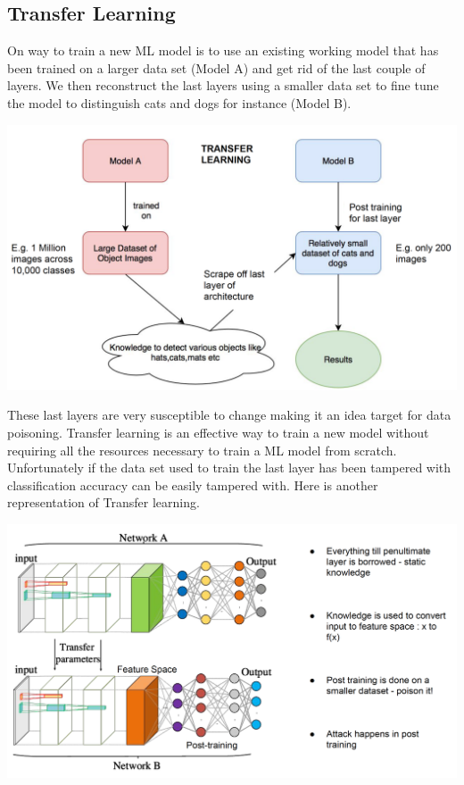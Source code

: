 \documentclass[twoside]{article}
\begin{document}
\subsection{Transfer Learning}

On way to train a new ML model is to use an existing working model that has been trained on a larger data set (Model A) and get rid of the last couple of layers. We then reconstruct the last layers using a smaller data set to fine tune the model to distinguish cats and dogs for instance (Model B). 

\begin{center}
    \includegraphics[scale=0.3]{MLTransfer.png}
\end{center}

These last layers are very susceptible to change making it an idea target for data poisoning. Transfer learning is an effective way to train a new model without requiring all the resources necessary to train a ML model from scratch. Unfortunately if the data set used to train the last layer has been tampered with classification accuracy can be easily tampered with. Here is another representation of Transfer learning.

\begin{center}
    \includegraphics[scale=0.3]{MLTransfer2.png}
\end{center}
\end{document}
